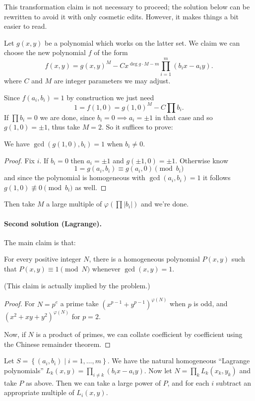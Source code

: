 \begin{remark*}
  This transformation claim is not necessary to proceed;
  the solution below can be rewritten to avoid it with only cosmetic edits.
  However, it makes things a bit easier to read.
\end{remark*}

Let $g(x,y)$ be a polynomial which works on the latter set.
We claim we can choose the new polynomial $f$ of the form
\[ f(x,y) = g(x,y)^{M} - C x^{\deg g \cdot M-m} \prod_{i=1}^m (b_i x - a_i y). \]
where $C$ and $M$ are integer parameters we may adjust.

Since $f(a_i, b_i) = 1$ by construction we just need
\[ 1 = f(1,0) = g(1,0)^M - C \prod b_i. \]
If $\prod b_i = 0$ we are done,
since $b_i = 0 \implies a_i = \pm 1$ in that case
and so $g(1, 0) = \pm 1$, thus take $M = 2$.
So it suffices to prove:
\begin{claim*}
  We have $\gcd\left( g(1,0), b_i \right) = 1$ when $b_i \neq 0$.
\end{claim*}
\begin{proof}
  Fix $i$. If $b_i = 0$ then $a_i = \pm 1$ and $g(\pm 1,0) = \pm 1$.
  Otherwise know
  \[ 1 = g(a_i, b_i) \equiv g(a_i, 0) \pmod{b_i} \]
  and since the polynomial is homogeneous with $\gcd(a_i, b_i) = 1$
  it follows $g(1,0) \not\equiv 0 \pmod{b_i}$ as well.
\end{proof}
Then take $M$ a large multiple of $\varphi(\prod |b_i|)$ and we're done.

\paragraph{Second solution (Lagrange).}
The main claim is that:
\begin{claim*}
  For every positive integer $N$,
  there is a homogeneous polynomial $P(x,y)$ such that
  $P(x,y) \equiv 1 \pmod N$ whenever $\gcd(x,y) = 1$.
\end{claim*}
(This claim is actually implied by the problem.)
\begin{proof}
  For $N = p^e$ a prime take $(x^{p-1} + y^{p-1})^{\varphi(N)}$
  when $p$ is odd, and $(x^2+xy+y^2)^{\varphi(N)}$ for $p=2$.

  Now, if $N$ is a product of primes,
  we can collate coefficient by coefficient using the
  Chinese remainder theorem.
\end{proof}

Let $S = \left\{ (a_i, b_i) \mid i=1, \dots, m \right\}$.
We have the natural homogeneous ``Lagrange polynomials''
$L_k(x,y) = \prod_{i \neq k} (b_i x - a_i y)$.
Now let $N = \prod_k L_k(x_k, y_k)$ and take $P$ as above.
Then we can take a large power of $P$,
and for each $i$ subtract an appropriate multiple of $L_i(x,y)$.
